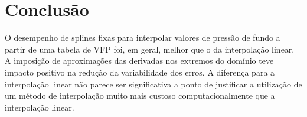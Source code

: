 \documentclass[final,5p]{elsarticle}
\numberwithin{equation}{section}
\begin{document}
    \section{Conclusão}
    
        O desempenho de splines fixas para interpolar valores de pressão de fundo a partir de uma tabela de VFP foi, em geral, melhor que o da interpolação linear. A imposição de aproximações das derivadas nos extremos do domínio teve impacto positivo na redução da variabilidade dos erros. A diferença para a interpolação linear não parece ser significativa a ponto de justificar a utilização de um método de interpolação muito mais custoso computacionalmente que a interpolação linear.

    

\appendix




 








\end{document}
